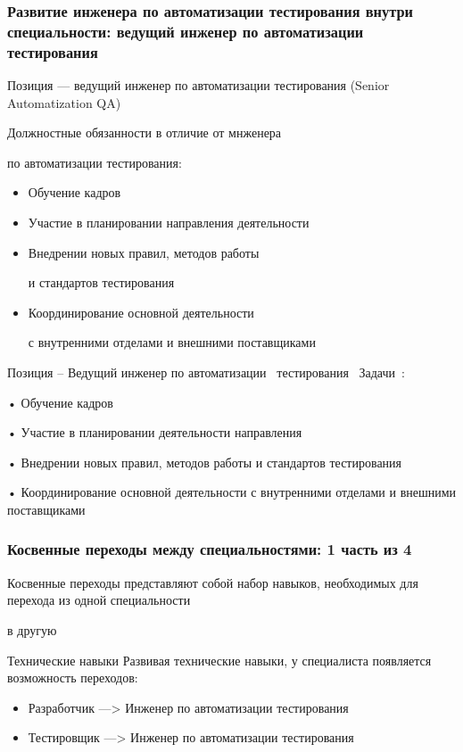 \documentclass{../industrial-development}
\begin{document}
\begin{frame} \frametitle{Развитие инженера по автоматизации тестирования внутри специальности: ведущий инженер по автоматизации тестирования }
 \begin{block}{}
  \alert{Позиция --- ведущий инженер по автоматизации тестирования (Senior Automatization QA)}

Должностные обязанности в отличие от мнженера 

по автоматизации тестирования: 
  \end{block}
  \begin{itemize}
  \item Обучение кадров
  \item  Участие в планировании направления деятельности
  \item Внедрении новых правил, методов работы 

и стандартов тестирования
 \item Координирование основной деятельности 

с внутренними отделами и внешними поставщиками
  \end{itemize}
\end{frame}

\lecturenotes

Позиция – Ведущий  инженер по автоматизации~\cite{hh} тестирования~\cite{itcf}
Задачи~\cite{rab}:

•	Обучение кадров

•	Участие в планировании деятельности направления

•	Внедрении новых правил, методов работы и стандартов тестирования

•	Координирование основной деятельности с внутренними отделами и внешними поставщиками





\begin{frame} \frametitle{Косвенные переходы между специальностями: 1 часть из 4}


Косвенные переходы представляют собой набор навыков, необходимых для перехода из одной специальности 

в другую

 \bigskip
 \begin{block}{Технические навыки}
 Развивая \alert{технические навыки}, у специалиста появляется возможность переходов: 
\begin{itemize}
  \item Разработчик ---> Инженер по автоматизации тестирования
  \item Тестировщик ---> Инженер по автоматизации тестирования
  \end{itemize}
  \end{block}
\end{frame}
\end{document}
